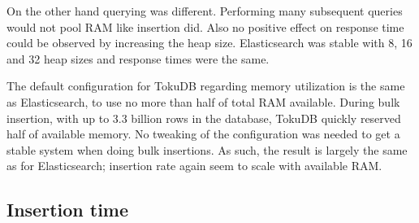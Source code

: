 On the other hand querying was different. Performing many subsequent queries would not pool RAM like insertion did. Also no positive effect on response time could be observed by increasing the heap size. Elasticsearch was stable with 8, 16 and 32 heap sizes and response times were the same. 

The default configuration for TokuDB regarding memory utilization is the same as Elasticsearch, to use no more than half of total RAM available. During bulk insertion, with up to 3.3 billion rows in the database, TokuDB quickly reserved half of available memory. No tweaking of the configuration was needed to get a stable system when doing bulk insertions. As such, the result is largely the same as for Elasticsearch; insertion rate again seem to scale with available RAM.


%
%

\subsection{Insertion time}

